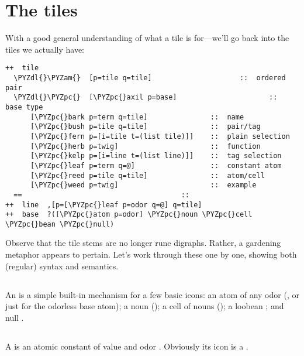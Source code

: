 \section{The tiles}

With a good general understanding of what a tile is for---we'll
go back into the tiles we actually have:

\begin{framed_shaded}
\begin{Verbatim}[fontsize=\relsize{-2.5},fontseries=b,commandchars=\\\{\}]
++  tile  
  \PYZdl{}\PYZam{}  [p=tile q=tile]                     ::  ordered pair
  \PYZdl{}\PYZpc{}  [\PYZpc{}axil p=base]                      ::  base type
      [\PYZpc{}bark p=term q=tile]               ::  name
      [\PYZpc{}bush p=tile q=tile]               ::  pair/tag
      [\PYZpc{}fern p=[i=tile t=(list tile)]]    ::  plain selection
      [\PYZpc{}herb p=twig]                      ::  function
      [\PYZpc{}kelp p=[i=line t=(list line)]]    ::  tag selection
      [\PYZpc{}leaf p=term q=@]                  ::  constant atom
      [\PYZpc{}reed p=tile q=tile]               ::  atom/cell
      [\PYZpc{}weed p=twig]                      ::  example
  ==                                      ::
++  line  ,[p=[\PYZpc{}leaf p=odor q=@] q=tile]
++  base  ?([\PYZpc{}atom p=odor] \PYZpc{}noun \PYZpc{}cell \PYZpc{}bean \PYZpc{}null)
\end{Verbatim}
\end{framed_shaded}
Observe that the tile stems are no longer rune digraphs.  Rather,
a gardening metaphor appears to pertain.  Let's work through
these one by one, showing both (regular) syntax and semantics.

\subsection{\kode{[\%axil p=base]}}

An  is a simple built-in mechanism for a few basic
icons: an atom of any odor (, or just  for the
odorless base atom); a noun (\kode{*}); a cell of nouns (\kode{\ket }); a
loobean ; and null \kode{\sig }. 

\subsection{\kode{[\%leaf p=term q=@]}}

A  is an atomic constant of value  and odor .
Obviously its icon is a .

